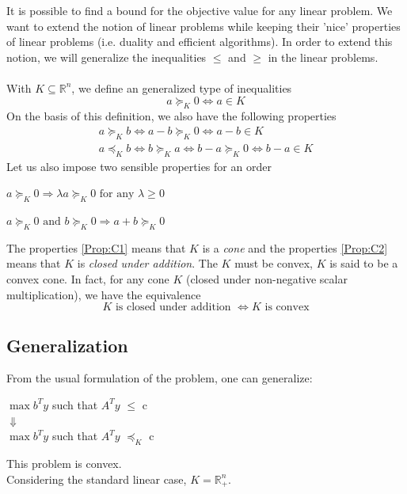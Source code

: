 It is possible to find a bound for the objective value for any linear problem. We want to extend the notion of linear problems while keeping their 'nice' properties of linear problems (i.e. duality and efficient algorithms). In order to extend this notion, we will generalize the inequalities $\leq$ and $\geq$ in the linear problems. \\ \\
With $K \subseteq \mathbb{R}^n$, we define an generalized type of inequalities\[ a \succeq_K 0
 \Leftrightarrow a \in K \]
On the basis of this definition, we also have the following properties \begin{align*}
 a \succeq_K b \Leftrightarrow a-b \succeq_K 0
\Leftrightarrow a-b \in K \\ a \preceq_K b
\Leftrightarrow b \succeq_K a \Leftrightarrow b-a \succeq_K 0
\Leftrightarrow b-a \in K \end{align*}
Let us also impose two sensible properties for an order

\begin{property}
\label{Prop:C1}
$a \succeq_K 0 \Rightarrow \lambda a \succeq_K 0 \text{ for any } \lambda \ge 0$ 
\end{property}
\begin{property}
\label{Prop:C2}
$a \succeq_K 0 \text{ and } b \succeq_K 0 \Rightarrow a+b \succeq_K 0$
\end{property}
The properties \ref{Prop:C1} means that $K$ is a \emph{cone} and the properties \ref{Prop:C2} means that $K$ is \emph{closed under addition}.
The $K$ must be convex, $K$ is said to be a convex cone. In fact, for any cone $K$ (closed under non-negative scalar multiplication), we have the equivalence
\[ K \text{ is closed under addition } \Leftrightarrow K \text{ is convex} \]

\subsection{Generalization}
From the usual formulation of the problem, one can generalize: 
\begin{center}$\max b^Ty$ such that $A^Ty$ $\leqslant$ c \\
$\Downarrow$ \\
$\max b^Ty$ such that $A^Ty$ $\preceq_K$ c
\end{center}
This problem is convex.\\
Considering the standard linear case, $K = \mathbb{R}^n_+$.

